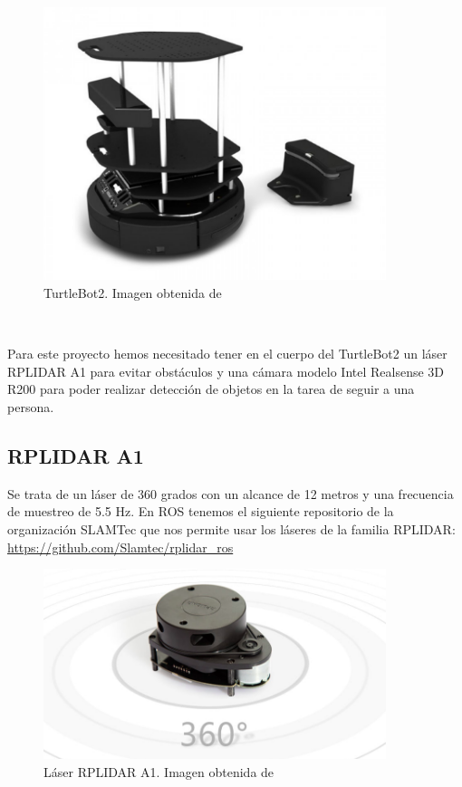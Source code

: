 \begin{figure} [H]
  \begin{center}
    \includegraphics[width=10cm]{imagenes/cap3/turtlebot2-real.png}
  \end{center}
  \caption[TurtleBot2]{TurtleBot2. Imagen obtenida de \cite{turtlebot2}}
  \label{fig:turtlebot2_real}
\end{figure}\

Para este proyecto hemos necesitado tener en el cuerpo del TurtleBot2 un láser RPLIDAR A1 para evitar obstáculos y una cámara modelo Intel Realsense 3D R200 para poder realizar detección de objetos en la tarea de seguir a una persona.

\subsection{RPLIDAR A1}
\label{subsec:turtlebot2_rplidar_a1}

Se trata de un láser de 360 grados con un alcance de 12 metros y una frecuencia de muestreo de 5.5 Hz. En ROS tenemos el siguiente repositorio de la organización SLAMTec que nos permite usar los láseres de la familia RPLIDAR: \url{https://github.com/Slamtec/rplidar_ros}\\

\begin{figure} [H]
  \begin{center}
    \includegraphics[width=10cm]{imagenes/cap3/rplidar-a1.png}
  \end{center}
  \caption[Láser RPLIDAR A1]{Láser RPLIDAR A1. Imagen obtenida de \cite{rplidar_a1}}
  \label{fig:rplidar_a1}
\end{figure}\

